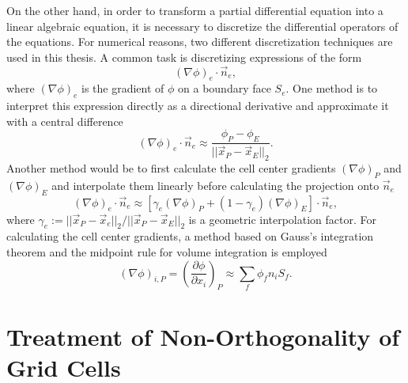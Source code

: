 On the other hand, in order to transform a partial differential equation into a linear algebraic equation, it is necessary to discretize the differential operators of the equations. For numerical reasons, two different discretization techniques are used in this thesis. A common task is discretizing expressions of the form
\begin{displaymath}
  \left(\nabla \phi\right)_e \cdot \vec{n}_e,
\end{displaymath}
where \(\left(\nabla \phi\right)_e\) is the gradient of \(\phi\) on a boundary face \(S_e\). One method is to interpret this expression directly as a directional derivative and approximate it with a central difference
\begin{equation}
  \label{eq:cds}
  \left(\nabla \phi\right)_e \cdot \vec{n}_e \approx \frac{\phi_P - \phi_E}{|| \vec{x}_P - \vec{x}_E ||_2}.
\end{equation}
Another method would be to first calculate the cell center gradients \(\left(\nabla \phi \right)_P\) and \(\left(\nabla \phi \right)_E\) and interpolate them linearly before calculating the projection onto \(\vec{n}_e\)
\begin{equation}
  \label{eq:interpolgrad}
  \left(\nabla \phi\right)_e \cdot \vec{n}_e 
  \approx 
  \left[\gamma_e \left(\nabla \phi \right)_P + (1-\gamma_e) \left(\nabla \phi \right)_E \right] \cdot \vec{n}_e,
\end{equation}
where \( \gamma_e := {||\vec{x}_P - \vec{x}_e||_2}/{||\vec{x}_P - \vec{x}_E||_2}\) is a geometric interpolation factor. For calculating the cell center gradients, a method based on Gauss's integration theorem and the midpoint rule for volume integration is employed
\begin{equation}
  \label{eq:gaussgrad}
  \left( \nabla \phi \right)_{i,P}
  =
  \left( \frac{\partial \phi}{\partial x_i}\right)_P
  \approx
  \sum_f \phi_f n_i S_f.
\end{equation}

\section{Treatment of Non-Orthogonality of Grid Cells}
\label{sec:nonorth}

